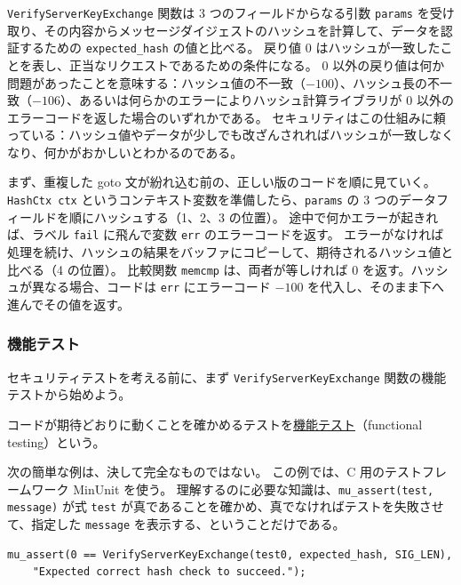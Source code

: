 \documentclass[uplatex]{jsarticle}
\def\label#1{}%
\begin{document}
\texttt{VerifyServerKeyExchange} 関数は 3 つのフィールドからなる引数 \texttt{params} を受け取り、その内容からメッセージダイジェストのハッシュを計算して、データを認証するための \texttt{expected\_hash} の値と比べる。
戻り値 0 はハッシュが一致したことを表し、正当なリクエストであるための条件になる。
0 以外の戻り値は何か問題があったことを意味する：ハッシュ値の不一致（$-100$）、ハッシュ長の不一致（$-106$）、あるいは何らかのエラーによりハッシュ計算ライブラリが 0 以外のエラーコードを返した場合のいずれかである。
セキュリティはこの仕組みに頼っている：ハッシュ値やデータが少しでも改ざんされればハッシュが一致しなくなり、何かがおかしいとわかるのである。

まず、重複した goto 文が紛れ込む前の、正しい版のコードを順に見ていく。
\texttt{HashCtx ctx} というコンテキスト変数を準備したら、\texttt{params} の 3 つのデータフィールドを順にハッシュする（1、2、3 の位置）。
途中で何かエラーが起きれば、ラベル \texttt{fail} に飛んで変数 \texttt{err} のエラーコードを返す。
エラーがなければ処理を続け、ハッシュの結果をバッファにコピーして、期待されるハッシュ値と比べる（4 の位置）。
比較関数 \texttt{memcmp} は、両者が等しければ 0 を返す。ハッシュが異なる場合、コードは \texttt{err} にエラーコード $-100$ を代入し、そのまま下へ進んでその値を返す。

\subsubsection{機能テスト}

セキュリティテストを考える前に、まず \texttt{VerifyServerKeyExchange} 関数の機能テストから始めよう。

\begin{dfn}[機能テスト]\label{dfn:ch12-functional-testing}
コードが期待どおりに動くことを確かめるテストを\underline{機能テスト}（functional testing）という。
\end{dfn}

次の簡単な例は、決して完全なものではない。
この例では、C 用のテストフレームワーク MinUnit を使う。
理解するのに必要な知識は、\texttt{mu\_assert(test, message)} が式 \texttt{test} が真であることを確かめ、真でなければテストを失敗させて、指定した \texttt{message} を表示する、ということだけである。

\begin{verbatim}
mu_assert(0 == VerifyServerKeyExchange(test0, expected_hash, SIG_LEN),
    "Expected correct hash check to succeed.");
\end{verbatim}
\end{document}
